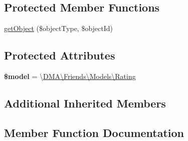 \subsection*{Protected Member Functions}
\begin{DoxyCompactItemize}
\item 
\hyperlink{classDMA_1_1Friends_1_1API_1_1Resources_1_1RatingResource_af5e4c42c24fa134bf9de2dd6d0223e92}{get\+Object} (\$object\+Type, \$object\+Id)
\end{DoxyCompactItemize}
\subsection*{Protected Attributes}
\begin{DoxyCompactItemize}
\item 
\hypertarget{classDMA_1_1Friends_1_1API_1_1Resources_1_1RatingResource_a62f43e96144be5b5a6a7b423582cc9a1}{}{\bfseries \$model} = \textquotesingle{}\textbackslash{}\hyperlink{classDMA_1_1Friends_1_1Models_1_1Rating}{D\+M\+A\textbackslash{}\+Friends\textbackslash{}\+Models\textbackslash{}\+Rating}\textquotesingle{}\label{classDMA_1_1Friends_1_1API_1_1Resources_1_1RatingResource_a62f43e96144be5b5a6a7b423582cc9a1}

\end{DoxyCompactItemize}
\subsection*{Additional Inherited Members}


\subsection{Member Function Documentation}
\hypertarget{classDMA_1_1Friends_1_1API_1_1Resources_1_1RatingResource_af5e4c42c24fa134bf9de2dd6d0223e92}{}
